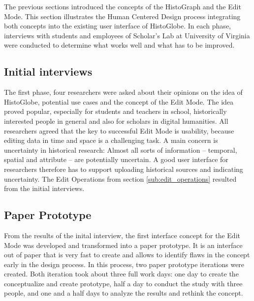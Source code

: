 The previous sections introduced the concepts of the HistoGraph and the Edit Mode. This section illustrates the Human Centered Design process integrating both concepts into the existing user interface of HistoGlobe. In each phase, interviews with students and employees of Scholar's Lab at University of Virginia were conducted to determine what works well and what has to be improved.

\subsection{Initial interviews} %
\label{sub:initial_interviews}

The first phase, four researchers were asked about their opinions on the idea of HistoGlobe, potential use cases and the concept of the Edit Mode. The idea proved popular, especially for students and teachers in school, historically interested people in general and also for scholars in digital humanities. All researchers agreed that the key to successful Edit Mode is usability, because editing data in time and space is a challenging task. A main concern is uncertainty in historical research: Almost all sorts of information -- temporal, spatial and attribute -- are potentially uncertain. A good user interface for researchers therefore has to support uploading historical sources and indicating uncertainty. The Edit Operations from section \ref{sub:edit_operations} resulted from the initial interviews.



\subsection{Paper Prototype} %
\label{sub:paper_prototype}

From the results of the inital interview, the first interface concept for the Edit Mode was developed and transformed into a paper prototype. It is an interface out of paper that is very fast to create and allows to identify flaws in the concept early in the design process. In this process, two paper prototype iterations were created. Both iteration took about three full work days: one day to create the conceptualize and create prototype, half a day to conduct the study with three people, and one and a half days to analyze the results and rethink the concept.

